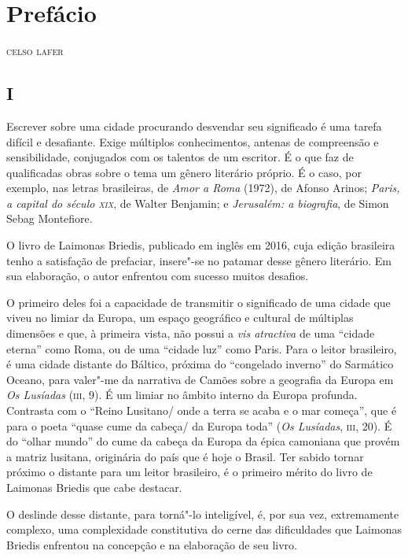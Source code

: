 \chapter[Prefácio, \emph{por Celso Lafer}]{Prefácio }

\begin{flushright}
\textsc{celso lafer}
\end{flushright}

\section*{I}

\noindent{}Escrever sobre uma cidade procurando desvendar seu significado é uma
tarefa difícil e desafiante. Exige múltiplos conhecimentos, antenas de
compreensão e sensibilidade, conjugados com os talentos de um escritor.
É o que faz de qualificadas obras sobre o tema um gênero literário
próprio. É o caso, por exemplo, nas letras brasileiras, de \emph{Amor a
Roma} (1972), de Afonso Arinos; \emph{Paris, a capital do século \textsc{xix}},
de Walter Benjamin; e \emph{Jerusalém: a biografia}, de Simon Sebag
Montefiore.

O livro de Laimonas Briedis, publicado em inglês em 2016, cuja edição
brasileira tenho a satisfação de prefaciar, insere"-se no patamar desse
gênero literário. Em sua elaboração, o autor enfrentou com sucesso
muitos desafios.

O primeiro deles foi a capacidade de transmitir o significado de uma
cidade que viveu no limiar da Europa, um espaço geográfico e cultural de
múltiplas dimensões e que, à primeira vista, não possui a \emph{vis
atractiva} de uma ``cidade eterna'' como Roma, ou de uma ``cidade luz''
como Paris. Para o leitor brasileiro, é uma cidade distante do Báltico,
próxima do ``congelado inverno'' do Sarmático Oceano, para valer"-me da
narrativa de Camões sobre a geografia da Europa em \emph{Os Lusíadas}
(\textsc{iii}, 9). É um limiar no âmbito interno da Europa profunda. Contrasta
com o ``Reino Lusitano/ onde a terra se acaba e o mar começa'', que é
para o poeta ``quase cume da cabeça/ da Europa toda'' (\emph{Os
Lusíadas}, \textsc{iii}, 20). É do ``olhar mundo'' do cume da cabeça da Europa da
épica camoniana que provém a matriz lusitana, originária do país que é
hoje o Brasil. Ter sabido tornar próximo o distante para um leitor
brasileiro, é o primeiro mérito do livro de Laimonas Briedis que cabe
destacar.

O deslinde desse distante, para torná"-lo inteligível, é, por sua vez,
extremamente complexo, uma complexidade constitutiva do cerne das
dificuldades que Laimonas Briedis enfrentou na concepção e na elaboração
de seu livro.

